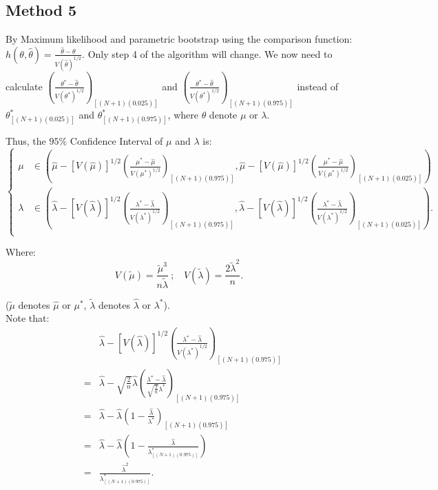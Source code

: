 \documentclass[12pt]{article}
\begin{document}
\subsection{Method 5}
By Maximum likelihood and parametric bootstrap using the comparison function: $h(\theta,\hat{\theta})=\frac{\hat{\theta}-\theta}{V(\hat{\theta})^{1/2}}$. Only step 4 of the algorithm will change. We now need to calculate $(\frac{\theta^{*}-\hat{\theta}}{V(\theta^{*})^{1/2}})_{[(N+1)(0.025)]}$ and $(\frac{\theta^{*}-\hat{\theta}}{V(\theta^{*})^{1/2}})_{[(N+1)(0.975)]}$ instead of $\theta^{*}_{[(N+1)(0.025)]}$ and $\theta^{*}_{[(N+1)(0.975)]}$, where $\theta$ denote $\mu$ or $\lambda$.

Thus, the $95\%$ Confidence Interval of $\mu$ and $\lambda$ is: 
 \begin{equation*}
\left\{                         
\begin{aligned}
\mu &\in (\hat{\mu}-[V(\hat{\mu})]^{1/2}(\frac{\mu^{*}-\hat{\mu}}{V(\mu^{*})^{1/2}})_{[(N+1)(0.975)]},\hat{\mu}-[V(\hat{\mu})]^{1/2}(\frac{\mu^{*}-\hat{\mu}}{V(\mu^{*})^{1/2}})_{[(N+1)(0.025)]})\\
\lambda &\in (\hat{\lambda}-[V(\hat{\lambda})]^{1/2}(\frac{\lambda^{*}-\hat{\lambda}}{V(\lambda^{*})^{1/2}})_{[(N+1)(0.975)]},\hat{\lambda}-[V(\hat{\lambda})]^{1/2}(\frac{\lambda^{*}-\hat{\lambda}}{V(\lambda^{*})^{1/2}})_{[(N+1)(0.025)]}).\\
\end{aligned}
\right.
\end{equation*}

Where:
$$V(\tilde{\mu})=\frac{\tilde{\mu}^3}{n \tilde{\lambda}} \ ; \ \ \ \ V(\tilde{\lambda})=\frac{2\tilde{\lambda}^2}{n}.$$

($\tilde{\mu}$ denotes $\hat{\mu}$ or $\mu^{*}$,  $\tilde{\lambda}$ denotes $\hat{\lambda}$ or $\lambda^{*}$).
\\
Note that: 
\begin{eqnarray*}
&&\hat{\lambda}-[V(\hat{\lambda})]^{1/2}(\frac{\lambda^{*}-\hat{\lambda}}{V(\lambda^{*})^{1/2}})_{[(N+1)(0.975)]}\\
&=&\hat{\lambda}-\sqrt{\frac{2}{n}}\hat{\lambda}(\frac{\lambda^{*}-\hat{\lambda}}{\sqrt{\frac{2}{n}}\lambda^*})_{[(N+1)(0.975)]}\\
&=&\hat{\lambda}-\hat{\lambda}(1-\frac{\hat{\lambda}}{\lambda^*})_{[(N+1)(0.975)]}\\
&=&\hat{\lambda}-\hat{\lambda}(1-\frac{\hat{\lambda}}{\lambda^{*}_{[(N+1)(0.975)]}})\\
&=&\frac{\hat{\lambda}^2}{\lambda_{[(N+1)(0.975)]}^{*}}.\\
\end{eqnarray*}
\end{document}
